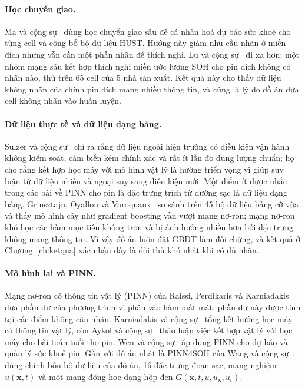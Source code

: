 \documentclass[12pt,a4paper,oneside]{report}
\theoremstyle{plain}
\theoremstyle{definition}
\begin{document}
\paragraph{Học chuyển giao.} Ma và cộng sự~\cite{ma2022} dùng học chuyển giao sâu để cá nhân hoá dự báo
sức khoẻ cho từng cell và công bố bộ dữ liệu HUST. Hướng này giảm nhu cầu nhãn ở miền đích nhưng vẫn cần một
phần nhãn để thích nghi. Lu và cộng sự~\cite{lu2023} đi xa hơn: một nhóm mạng sâu kết hợp thích nghi miền ước
lượng SOH cho pin đích không có nhãn nào, thử trên 65 cell của 5 nhà sản xuất. Kết quả này cho thấy dữ liệu
không nhãn của chính pin đích mang nhiều thông tin, và cũng là lý do đồ án đưa cell không nhãn vào huấn luyện.

\paragraph{Dữ liệu thực tế và dữ liệu dạng bảng.} Sulzer và cộng sự~\cite{sulzer2021} chỉ ra rằng dữ liệu
ngoài hiện trường có điều kiện vận hành không kiểm soát, cảm biến kém chính xác và rất ít lần đo dung lượng
chuẩn; họ cho rằng kết hợp học máy với mô hình vật lý là hướng triển vọng vì giúp suy luận từ dữ liệu nhiễu và
ngoại suy sang điều kiện mới. Một điểm ít được nhắc trong các bài về PINN cho pin là đặc trưng trích từ đường
sạc là dữ liệu dạng bảng. Grinsztajn, Oyallon và Varoquaux~\cite{grinsztajn2022} so sánh trên 45 bộ dữ liệu
bảng cỡ vừa và thấy mô hình cây như gradient boosting vẫn vượt mạng nơ-ron; mạng nơ-ron khó học các hàm mục tiêu
không trơn và bị ảnh hưởng nhiều hơn bởi đặc trưng không mang thông tin. Vì vậy đồ án luôn đặt GBDT làm đối
chứng, và kết quả ở Chương~\ref{ch:ketqua} xác nhận đây là đối thủ khó nhất khi có đủ nhãn.

\paragraph{Mô hình lai và PINN.} Mạng nơ-ron có thông tin vật lý (PINN) của Raissi, Perdikaris và
Karniadakis~\cite{raissi2019} đưa phần dư của phương trình vi phân vào hàm mất mát; phần dư này được tính tại
các điểm không cần nhãn. Karniadakis và cộng sự~\cite{karniadakis2021} tổng kết hướng học máy có thông tin
vật lý, còn Aykol và cộng sự~\cite{aykol2021} thảo luận việc kết hợp vật lý với học máy cho bài toán tuổi
thọ pin. Wen và cộng sự~\cite{wen2023} áp dụng PINN cho dự báo và quản lý sức khoẻ pin. Gần với đồ án nhất là
PINN4SOH của Wang và cộng sự~\cite{wang2024}: dùng chính bốn bộ dữ liệu của đồ án, 16 đặc trưng đoạn sạc, mạng
nghiệm $u(\mathbf{x}, t)$ và một mạng động học dạng hộp đen $G(\mathbf{x}, t, u, u_\mathbf{x}, u_t)$.
\end{document}
